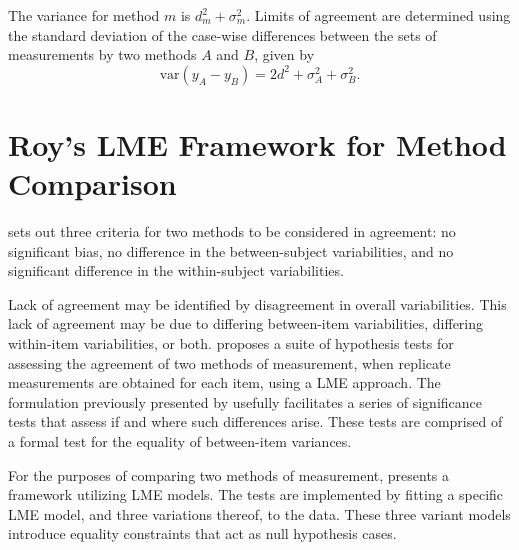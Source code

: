 \documentclass[12pt, a4paper]{report}
\theoremstyle{plain}
\theoremstyle{definition}
\theoremstyle{remark}
\begin{document}
The variance for method $m$ is $d^2_{m}+\sigma^2_{m}$. Limits of agreement are determined using the standard deviation of the case-wise differences between the sets of measurements by two methods $A$ and $B$, given by
\begin{equation}
\mbox{var} (y_{A}-y_{B}) = 2d^2 + \sigma^2_{A}+ \sigma^2_{B}.
\end{equation}






\section{Roy's LME Framework for Method Comparison }
\citet{Barnhart} sets out three criteria for two methods to be considered in agreement: no significant bias, no difference in the between-subject variabilities, and no significant difference in the within-subject variabilities.


Lack of agreement may be identified by disagreement in overall variabilities. This lack of agreement may be due to differing between-item variabilities, differing within-item variabilities, or both. \citet{ARoy2009} proposes a suite of hypothesis tests for assessing the agreement of two methods of measurement, when replicate measurements are obtained for each item, using a LME approach. The formulation previously presented by \citet{ARoy2009} usefully facilitates a series of significance tests that assess if and where such differences arise. These tests are comprised of a formal test for the equality of between-item variances.


For the purposes of comparing two methods of measurement, \citet{ARoy2009} presents a framework utilizing LME models. The tests are implemented by fitting a specific LME model, and three variations thereof, to the data. These three variant models introduce equality constraints that act as null hypothesis cases.
\end{document}
